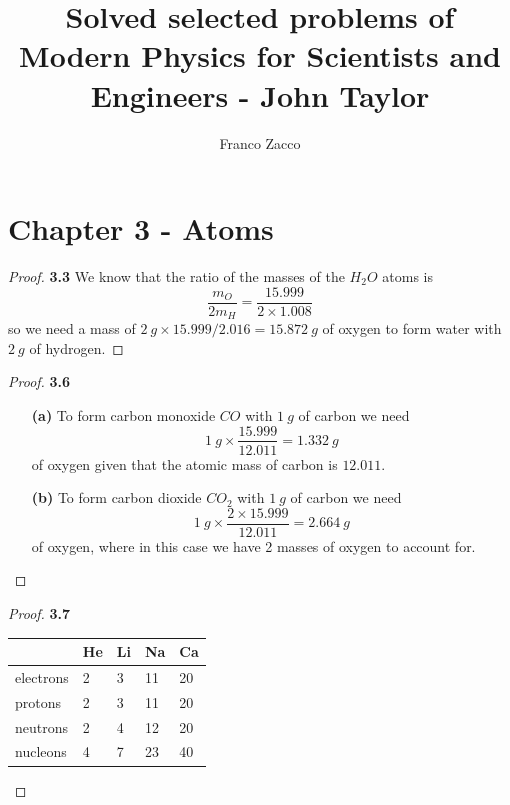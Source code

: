 \documentclass[11pt]{article}
\title{\textbf{Solved selected problems of Modern Physics for Scientists and Engineers - John Taylor}}
\author{Franco Zacco}
\date{}
\theoremstyle{definition}
\begin{document}
\maketitle
\thispagestyle{empty}

\section*{Chapter 3 - Atoms}

\begin{proof}{\textbf{3.3}}
    We know that the ratio of the masses of the $H_2O$ atoms is
    $$\frac{m_O}{2m_H} = \frac{15.999}{2\times 1.008}$$
    so we need a mass of $2~g \times 15.999/2.016  = 15.872~g$ of oxygen to
    form water with $2~g$ of hydrogen.
\end{proof}
\begin{proof}{\textbf{3.6}}
\begin{itemize}
    \item [\textbf{(a)}] To form carbon monoxide $CO$ with $1~g$ of carbon
    we need 
    $$1~g \times \frac{15.999}{12.011} = 1.332~g$$
    of oxygen given that the atomic mass of carbon is $12.011$.

    \item [\textbf{(b)}] To form carbon dioxide $CO_2$ with $1~g$ of carbon
    we need
    $$1~g \times \frac{2 \times 15.999}{12.011} = 2.664~g$$
    of oxygen, where in this case we have 2 masses of oxygen to account for.
\end{itemize}
\end{proof}
\cleardoublepage
\begin{proof}{\textbf{3.7}}
    \begin{center}
        \begin{tabular}{|l|l|l|l|l|} \hline
                  & He & Li & Na & Ca \\ \hline
        electrons & 2  & 3  & 11 & 20 \\ \hline
        protons   & 2  & 3  & 11 & 20 \\ \hline
        neutrons  & 2  & 4  & 12 & 20 \\ \hline
        nucleons  & 4  & 7  & 23 & 40 \\ \hline
    \end{tabular}
    \end{center}
\end{proof}
\end{document}

